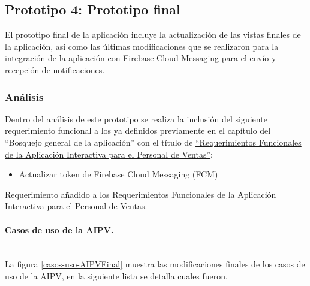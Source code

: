 \subsection{Prototipo 4: Prototipo final }

El prototipo final de la aplicación incluye la actualización de las vistas finales de la aplicación, así como las últimas modificaciones que se realizaron para la integración de la aplicación con Firebase Cloud Messaging para el envío y recepción de notificaciones. \\ \par


\subsubsection{Análisis}

Dentro del análisis de este prototipo se realiza la inclusión del siguiente requerimiento funcional a los ya definidos previamente en el capítulo del ``Bosquejo general de la aplicación''  con el título de \hyperlink{RFAPV}{``Requerimientos Funcionales de la Aplicación Interactiva para el Personal de Ventas''}:\\

\begin{itemize}
\item Actualizar token de Firebase Cloud Messaging (FCM)
\end{itemize}

\hypertarget{NRFAPV}{}
\begin{FRequirements}
\caption{Requerimiento añadido a los Requerimientos Funcionales de la Aplicación Interactiva para el Personal de Ventas.}
\end{FRequirements}

\paragraph{Casos de uso de la AIPV.} ~\\

La figura \ref{casos-uso-AIPVFinal} muestra las modificaciones finales de los casos de uso de la AIPV, en la siguiente lista se detalla cuales fueron.

